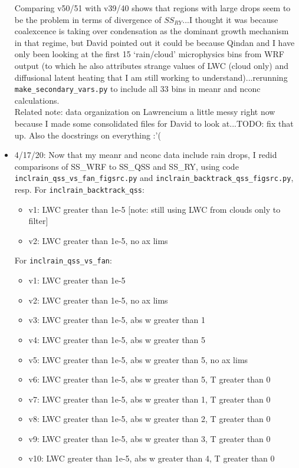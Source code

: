 \documentclass{article}
\begin{document}
\begin{itemize}
	\indent Comparing v50/51 with v39/40 shows that regions with large drops seem to be the problem in terms of divergence of $SS_{RY}$...I thought it was because coalexcence is taking over condensation as the dominant growth mechanism in that regime, but David pointed out it could be because Qindan and I have only been looking at the first 15 `rain/cloud' microphysics bins from WRF output (to which he also attributes strange values of LWC (cloud only) and diffusional latent heating that I am still working to understand)...rerunning \texttt{make\_secondary\_vars.py} to include all 33 bins in meanr and nconc calculations.\\

	\indent Related note: data organization on Lawrencium a little messy right now because I made some consolidated files for David to look at...TODO: fix that up. Also the docstrings on everything :'(
	\item 4/17/20: Now that my meanr and nconc data include rain drops, I redid comparisons of SS\_WRF to SS\_QSS and SS\_RY, using code \texttt{inclrain\_qss\_vs\_fan\_figsrc.py} and \texttt{inclrain\_backtrack\_qss\_figsrc.py}, resp. For \texttt{inclrain\_backtrack\_qss}:
	\begin{itemize}
		\item v1: LWC greater than 1e-5 [note: still using LWC from clouds only to filter]
		\item v2: LWC greater than 1e-5, no ax lims
	\end{itemize}
	\noindent For \texttt{inclrain\_qss\_vs\_fan}:
	\begin{itemize}
		\item v1: LWC greater than 1e-5
		\item v2: LWC greater than 1e-5, no ax lims
		\item v3: LWC greater than 1e-5, abs w greater than 1
		\item v4: LWC greater than 1e-5, abs w greater than 5 
		\item v5: LWC greater than 1e-5, abs w greater than 5, no ax lims
		\item v6: LWC greater than 1e-5, abs w greater than 5, T greater than 0
		\item v7: LWC greater than 1e-5, abs w greater than 1, T greater than 0
		\item v8: LWC greater than 1e-5, abs w greater than 2, T greater than 0
		\item v9: LWC greater than 1e-5, abs w greater than 3, T greater than 0
		\item v10: LWC greater than 1e-5, abs w greater than 4, T greater than 0

\end{itemize}
\end{itemize}
\end{document}
